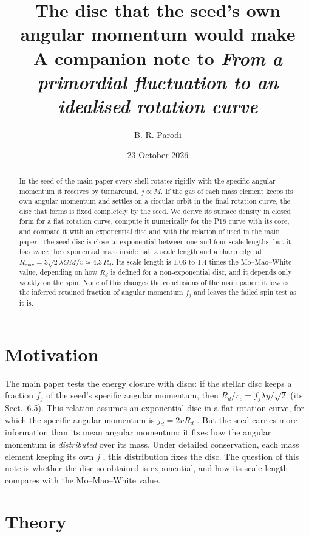 \documentclass[11pt,a4paper]{article}
\title{The disc that the seed's own angular momentum would make\\[4pt]
\large A companion note to \emph{From a primordial fluctuation to an idealised rotation curve}}
\author{B. R. Parodi}
\date{23 October 2026}
\newcommand{\rc}{r_c}
\newcommand{\Rmax}{R_{\max}}
\begin{document}
\maketitle

\begin{abstract}
In the seed of the main paper every shell rotates rigidly with the
specific angular momentum it receives by turnaround, $j\propto M$. If the
gas of each mass element keeps its own angular momentum and settles on a
circular orbit in the final rotation curve, the disc that forms is fixed
completely by the seed. We derive its surface density in closed form for
a flat rotation curve, compute it numerically for the P18 curve with its
core, and compare it with an exponential disc and with the relation of
\citet{Mo1998} used in the main paper. The seed disc is close to
exponential between one and four scale lengths, but it has twice the
exponential mass inside half a scale length and a sharp edge at
$\Rmax=3\sqrt2\lambda GM/v\simeq4.3\,R_d$. Its scale length is 1.06 to
1.4 times the Mo--Mao--White value, depending on how $R_d$ is defined for
a non-exponential disc, and it depends only weakly on the spin. None of
this changes the conclusions of the main paper; it lowers the inferred
retained fraction of angular momentum $f_j$ and leaves the failed spin
test as it is.
\end{abstract}

\section{Motivation}

The main paper tests the energy closure with discs: if the stellar disc
keeps a fraction $f_j$ of the seed's specific angular momentum, then
$R_d/\rc=f_j\lambda y/\sqrt2$ (its Sect.~6.5). This relation assumes an
exponential disc in a flat rotation curve, for which the specific angular
momentum is $j_d=2vR_d$ \citep{Fall1980,Mo1998}. But the seed carries
more information than its mean angular momentum: it fixes how the
angular momentum is \emph{distributed} over its mass. Under detailed
conservation, each mass element keeping its own $j$
\citep{Mestel1963,Fall1980}, this distribution fixes the disc. The
question of this note is whether the disc so obtained is exponential, and
how its scale length compares with the Mo--Mao--White value.

\section{Theory}
\end{document}
